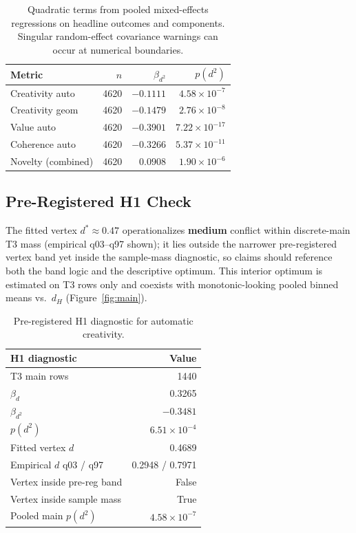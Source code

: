 \documentclass[sigconf,nonacm]{acmart}
\begin{document}
\begin{table}[t]
\centering
\small
\begin{tabular}{lrrr}
\toprule
Metric & $n$ & $\beta_{d^2}$ & $p(d^2)$ \\
\midrule
Creativity auto & 4620 & $-0.1111$ & $4.58{\times}10^{-7}$ \\
Creativity geom & 4620 & $-0.1479$ & $2.76{\times}10^{-8}$ \\
Value auto & 4620 & $-0.3901$ & $7.22{\times}10^{-17}$ \\
Coherence auto & 4620 & $-0.3266$ & $5.37{\times}10^{-11}$ \\
Novelty (combined) & 4620 & $0.0908$ & $1.90{\times}10^{-6}$ \\
\bottomrule
\end{tabular}
\caption{Quadratic terms from pooled mixed-effects regressions on headline outcomes and components. Singular random-effect covariance warnings can occur at numerical boundaries.}
\label{tab:quadratic}
\end{table}

\subsection{Pre-Registered H1 Check}

The fitted vertex $d^\ast{\approx}0.47$ operationalizes \textbf{medium} conflict within discrete-main T3 mass (empirical q03--q97 shown); it lies outside the narrower pre-registered vertex band yet inside the sample-mass diagnostic, so claims should reference both the band logic and the descriptive optimum. This interior optimum is estimated on T3 rows only and coexists with monotonic-looking pooled binned means vs.\ $d_H$ (Figure~\ref{fig:main}).

\begin{table}[t]
\centering
\small
\begin{tabular}{lr}
\toprule
H1 diagnostic & Value \\
\midrule
T3 main rows & 1440 \\
$\beta_d$ & 0.3265 \\
$\beta_{d^2}$ & $-0.3481$ \\
$p(d^2)$ & $6.51{\times}10^{-4}$ \\
Fitted vertex $d$ & 0.4689 \\
Empirical $d$ q03 / q97 & 0.2948 / 0.7971 \\
Vertex inside pre-reg band & False \\
Vertex inside sample mass & True \\
Pooled main $p(d^2)$ & $4.58{\times}10^{-7}$ \\
\bottomrule
\end{tabular}
\caption{Pre-registered H1 diagnostic for automatic creativity.}
\label{tab:h1}
\end{table}
\end{document}
